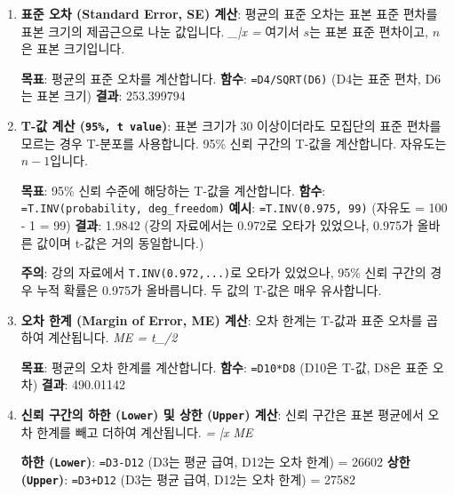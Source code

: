 \documentclass[11pt,a4paper]{book}
\newcommand{\excel}[1]{\texttt{#1}}
\newcommand{\formula}[1]{\textit{#1}}
\theoremstyle{definition}
\begin{document}
\begin{enumerate}
\begin{enumerate}
\begin{enumerate}
    \item \textbf{표준 오차 (Standard Error, SE) 계산}:
    평균의 표준 오차는 표본 표준 편차를 표본 크기의 제곱근으로 나눈 값입니다.
    \formula{\hat{\sigma}_{\bar{x}} = }
    여기서 $s$는 표본 표준 편차이고, $n$은 표본 크기입니다.
    \begin{examplebox}[title=Excel 표준 오차 계산]
        \textbf{목표}: 평균의 표준 오차를 계산합니다.
        \textbf{함수}: \texttt{=D4/SQRT(D6)} (D4는 표준 편차, D6는 표본 크기)
        \textbf{결과}: 253.399794
    \end{examplebox}

    \item \textbf{T-값 계산 (\excel{95\%, t value})}:
    표본 크기가 30 이상이더라도 모집단의 표준 편차를 모르는 경우 T-분포를 사용합니다. 95\% 신뢰 구간의 T-값을 계산합니다. 자유도는 $n-1$입니다.
    \begin{examplebox}[title=Excel T.INV 함수 사용법]
        \textbf{목표}: 95\% 신뢰 수준에 해당하는 T-값을 계산합니다.
        \textbf{함수}: \texttt{=T.INV(probability, deg\_freedom)}
        \textbf{예시}: \texttt{=T.INV(0.975, 99)} (자유도 = 100 - 1 = 99)
        \textbf{결과}: 1.9842 (강의 자료에서는 0.972로 오타가 있었으나, 0.975가 올바른 값이며 t-값은 거의 동일합니다.)
    \end{examplebox}
    \begin{warningbox}
        \textbf{주의}: 강의 자료에서 \texttt{T.INV(0.972,...)}로 오타가 있었으나, 95\% 신뢰 구간의 경우 누적 확률은 0.975가 올바릅니다. 두 값의 T-값은 매우 유사합니다.
    \end{warningbox}

    \item \textbf{오차 한계 (Margin of Error, ME) 계산}:
    오차 한계는 T-값과 표준 오차를 곱하여 계산됩니다.
    \formula{ME = t_{\alpha/2} \times {}}
    \begin{examplebox}[title=Excel 오차 한계 계산]
        \textbf{목표}: 평균의 오차 한계를 계산합니다.
        \textbf{함수}: \texttt{=D10*D8} (D10은 T-값, D8은 표준 오차)
        \textbf{결과}: 490.01142
    \end{examplebox}

    \item \textbf{신뢰 구간의 하한 (\excel{Lower}) 및 상한 (\excel{Upper}) 계산}:
    신뢰 구간은 표본 평균에서 오차 한계를 빼고 더하여 계산됩니다.
    \formula{ = \bar{x} \pm ME}
    \begin{examplebox}[title=Excel 신뢰 구간 계산]
        \textbf{하한 (\excel{Lower})}: \texttt{=D3-D12} (D3는 평균 급여, D12는 오차 한계) = 26602
        \textbf{상한 (\excel{Upper})}: \texttt{=D3+D12} (D3는 평균 급여, D12는 오차 한계) = 27582
    \end{examplebox}


\end{enumerate}
\end{enumerate}
\end{enumerate}
\end{document}
